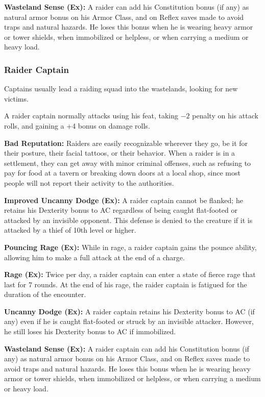 \textbf{Wasteland Sense (Ex):} A raider can add his Constitution bonus (if any) as natural armor bonus on his Armor Class, and on Reflex saves made to avoid traps and natural hazards. He loses this bonus when he is wearing heavy armor or tower shields, when immobilized or helpless, or when carrying a medium or heavy load.


\subsubsection{Raider Captain}

Captains usually lead a raiding squad into the wastelands, looking for new victims.

A raider captain normally attacks using his  feat, taking $-2$ penalty on his attack rolls, and gaining a +4 bonus on damage rolls.

\textbf{Bad Reputation:} Raiders are easily recognizable wherever they go, be it for their posture, their facial tattoos, or their behavior. When a raider is in a settlement, they can get away with minor criminal offenses, such as refusing to pay for food at a tavern or breaking down doors at a local shop, since most people will not report their activity to the authorities.

\textbf{Improved Uncanny Dodge (Ex):} A raider captain cannot be flanked; he retains his Dexterity bonus to AC regardless of being caught flat-footed or attacked by an invisible opponent. This defense is denied to the creature if it is attacked by a thief of 10th level or higher.

\textbf{Pouncing Rage (Ex):} While in rage, a raider captain gains the pounce ability, allowing him to make a full attack at the end of a charge.

\textbf{Rage (Ex):} Twice per day, a raider captain can enter a state of fierce rage that last for 7 rounds. At the end of his rage, the raider captain is fatigued for the duration of the encounter.

\textbf{Uncanny Dodge (Ex):} A raider captain retains his Dexterity bonus to AC (if any) even if he is caught flat-footed or struck by an invisible attacker. However, he still loses his Dexterity bonus to AC if immobilized.

\textbf{Wasteland Sense (Ex):} A raider captain can add his Constitution bonus (if any) as natural armor bonus on his Armor Class, and on Reflex saves made to avoid traps and natural hazards. He loses this bonus when he is wearing heavy armor or tower shields, when immobilized or helpless, or when carrying a medium or heavy load.



